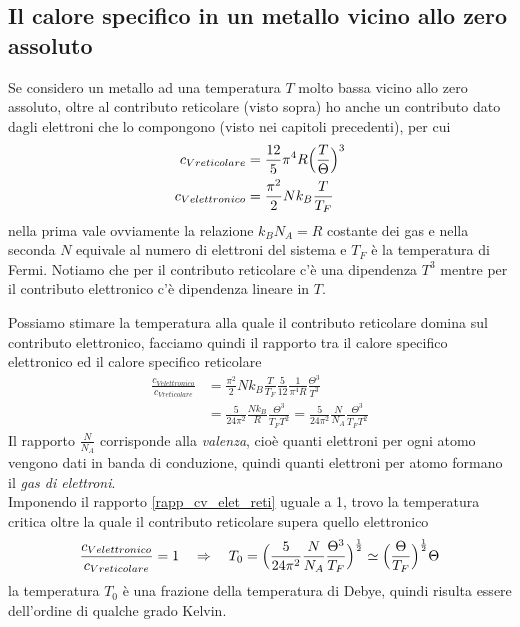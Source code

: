 \subsection{Il calore specifico in un metallo vicino allo zero assoluto}
Se considero un metallo ad una temperatura $T$ molto bassa vicino allo zero assoluto, oltre al contributo reticolare (visto sopra) ho anche un contributo dato dagli elettroni che lo compongono (visto nei capitoli precedenti), per cui
\begin{equation}
\begin{split}
c_{V reticolare} & = \frac{12}{5} \pi^4 R \Bigl(  \frac{T}{\Theta}  \Bigr)^3 \\
c_{V elettronico} & = \frac{\pi^2}{2} N k_B \frac{T}{T_F}
\end{split}
\end{equation}
nella prima vale ovviamente la relazione $k_B N_A = R$ costante dei gas e nella seconda $N$ equivale al numero di elettroni del sistema e $T_F$ è la temperatura di Fermi.
Notiamo che per il contributo reticolare c'è una dipendenza $T^3$ mentre per il contributo elettronico c'è dipendenza lineare in $T$.

Possiamo stimare la temperatura alla quale il contributo reticolare domina sul contributo elettronico, facciamo quindi il rapporto tra il calore specifico elettronico ed il calore specifico reticolare
\begin{equation}
\begin{split}
\frac{c_{V elettronico} }{c_{V reticolare} } & = \frac{\pi^2}{2} N k_B \frac{T}{T_F} \frac{5}{12} \frac{1}{\pi^4 R} \frac{\Theta^3}{T^3} \\
& = \frac{5}{24 \pi^2} \frac{N k_B}{R} \frac{\Theta^3}{T_F T^2}
= \frac{5}{24 \pi^2} \frac{N}{N_A} \frac{\Theta^3}{T_F T^2} 
\end{split}
\label{rapp_cv_elet_reti}
\end{equation}
Il rapporto $\frac{N}{N_A}$ corrisponde alla \textit{valenza}, cioè quanti elettroni per ogni atomo vengono dati in banda di conduzione, quindi quanti elettroni per atomo formano il \textit{gas di elettroni}. \\
Imponendo il rapporto \ref{rapp_cv_elet_reti} uguale a 1, trovo la temperatura critica oltre la quale il contributo reticolare supera quello elettronico
\begin{equation}
\begin{split}
\frac{c_{V elettronico} }{c_{V reticolare} } = 1
\quad\Rightarrow\quad 
T_0 = \Bigl(  \frac{5}{24 \pi^2} \frac{N}{N_A} \frac{\Theta^3}{T_F} \Bigr)^\frac{1}{2}
\simeq \Bigl(  \frac{\Theta}{T_F}  \Bigr)^\frac{1}{2} \Theta
\end{split}
\end{equation}
la temperatura $T_0$ è una frazione della temperatura di Debye, quindi risulta essere dell'ordine di qualche grado Kelvin.


